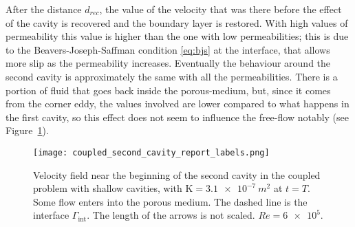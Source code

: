 After the distance $d_{rec}$, the value of the velocity that was there 
before the effect of the cavity is recovered and the boundary layer is 
restored. With high values of permeability this value is higher than the one 
with low permeabilities; this is due to the Beavers-Joseph-Saffman condition 
\eqref{eq:bjs} at the interface, that allows more slip as the permeability 
increases. Eventually the behaviour around the 
second cavity is approximately the same with all the permeabilities. There is a 
portion of fluid that goes back inside the porous-medium, but, since it comes 
from the corner eddy, the values involved are lower compared to what happens in 
the first cavity, so this effect does not seem to influence the free-flow 
notably (see Figure~\ref{fig:coupledsecondcav}).
\begin{figure}
	\centering
	\texttt{[image: coupled\_second\_cavity\_report\_labels.png]}
	\caption[Velocity field near the beginning of the second cavity in the coupled problem with shallow cavities]{Velocity field near the beginning of the second cavity in the coupled problem with shallow cavities, with $\mathrm{K}=\SI{3.1e-7}{m^2}$ at $t=T$. Some flow enters into the porous medium. The dashed line is the interface $\Gamma_\text{int}$. The length of the arrows is not scaled. $Re=\num{6e5}$.}
	\label{fig:coupledsecondcav}
\end{figure}

